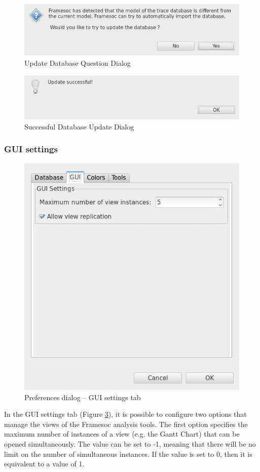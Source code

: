 \documentclass[twoside]{article}
\begin{document}
\begin{sloppypar}
\begin{figure}[h!]
	\centering
	\includegraphics[width=.5\textwidth]{images/updateDBQuestion.png}
	\caption{Update Database Question Dialog}
	\label{fig:updateDBQuestion}
\end{figure}

\begin{figure}[h!]
	\centering
	\includegraphics[width=.5\textwidth]{images/updateDBSuccess.png}
	\caption{Successful Database Update Dialog}
	\label{fig:updateDBSuccess}
\end{figure}

\subsubsection{GUI settings}
\label{subsec:gui}

\begin{figure}[h!]
	\centering
	\includegraphics[width=.5\textwidth]{images/pref_gui.png}
	\caption{Preferences dialog -- GUI settings tab}
	\label{fig:pref_dialog_gui}
\end{figure}

In the GUI settings tab (Figure \ref{fig:pref_dialog_gui}), it is possible to configure two options that manage the views of the Framesoc analysis tools. The first option specifies the maximum number of instances of a view (e.g. the Gantt Chart) that can be opened simultaneously. The value can be set to -1, meaning that there will be no limit on the number of simultaneous instances. If the value is set to 0, then it is equivalent to a value of 1.


\end{sloppypar}
\end{document}
